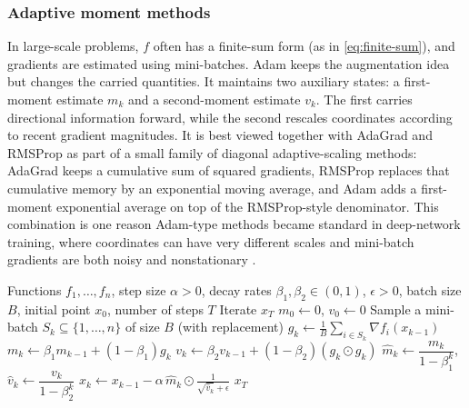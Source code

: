 \subsubsection{Adaptive moment methods}
\label{subsubsec:adam}

In large-scale problems, $f$ often has a finite-sum form (as in \cref{eq:finite-sum}), and gradients are estimated using mini-batches.
Adam keeps the augmentation idea but changes the carried quantities.
It maintains two auxiliary states: a first-moment estimate $m_k$ and a second-moment estimate $v_k$.
The first carries directional information forward, while the second rescales coordinates according to recent gradient magnitudes.
It is best viewed together with AdaGrad and RMSProp as part of a small family of diagonal adaptive-scaling methods:
AdaGrad keeps a cumulative sum of squared gradients, RMSProp replaces that cumulative memory by an exponential moving average, and Adam adds a first-moment exponential average on top of the RMSProp-style denominator.
This combination is one reason Adam-type methods became standard in deep-network training, where coordinates can have very different scales and mini-batch gradients are both noisy and nonstationary \citep[\S1]{kingma_ba_2015_adam}.

\begin{algorithm}
  \caption{Adam (adaptive moment estimation)}
  \label{alg:adam}
  \begin{algorithmic}[1]
    \Require Functions $f_1,\dots,f_n$, step size $\alpha>0$, decay rates $\beta_1,\beta_2\in(0,1)$, $\epsilon>0$, batch size $B$, initial point $x_0$, number of steps $T$
    \Ensure Iterate $x_T$
    \State $m_0 \gets 0$, $v_0 \gets 0$
      \State Sample a mini-batch $S_k \subseteq \{1,\dots,n\}$ of size $B$ (with replacement)
      \State $g_k \gets \frac{1}{B}\sum_{i\in S_k} \nabla f_i(x_{k-1})$ 
      \State $m_k \gets \beta_1 m_{k-1} + (1-\beta_1) g_k$ 
      \State $v_k \gets \beta_2 v_{k-1} + (1-\beta_2) (g_k \odot g_k)$ 
      \State $\hat m_k \gets \dfrac{m_k}{1-\beta_1^k}$, $\hat v_k \gets \dfrac{v_k}{1-\beta_2^k}$ 
      \State $x_k \gets x_{k-1} - \alpha \, \hat m_k \odot \frac{1}{\sqrt{\hat v_k}+\epsilon}$ 
    \EndFor
    \State \Return $x_T$
  \end{algorithmic}
\end{algorithm}

